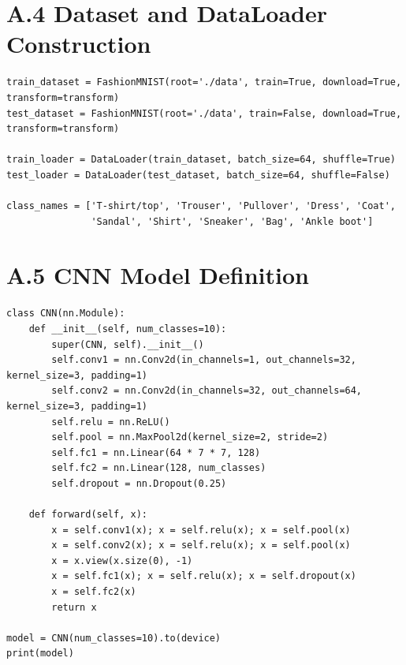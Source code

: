 \documentclass[12pt,a4paper]{report}
\begin{document}
\section*{A.4 Dataset and DataLoader Construction}
\begin{lstlisting}
train_dataset = FashionMNIST(root='./data', train=True, download=True, transform=transform)
test_dataset = FashionMNIST(root='./data', train=False, download=True, transform=transform)

train_loader = DataLoader(train_dataset, batch_size=64, shuffle=True)
test_loader = DataLoader(test_dataset, batch_size=64, shuffle=False)

class_names = ['T-shirt/top', 'Trouser', 'Pullover', 'Dress', 'Coat',
               'Sandal', 'Shirt', 'Sneaker', 'Bag', 'Ankle boot']
\end{lstlisting}

\section*{A.5 CNN Model Definition}
\begin{lstlisting}
class CNN(nn.Module):
    def __init__(self, num_classes=10):
        super(CNN, self).__init__()
        self.conv1 = nn.Conv2d(in_channels=1, out_channels=32, kernel_size=3, padding=1)
        self.conv2 = nn.Conv2d(in_channels=32, out_channels=64, kernel_size=3, padding=1)
        self.relu = nn.ReLU()
        self.pool = nn.MaxPool2d(kernel_size=2, stride=2)
        self.fc1 = nn.Linear(64 * 7 * 7, 128)
        self.fc2 = nn.Linear(128, num_classes)
        self.dropout = nn.Dropout(0.25)

    def forward(self, x):
        x = self.conv1(x); x = self.relu(x); x = self.pool(x)
        x = self.conv2(x); x = self.relu(x); x = self.pool(x)
        x = x.view(x.size(0), -1)
        x = self.fc1(x); x = self.relu(x); x = self.dropout(x)
        x = self.fc2(x)
        return x

model = CNN(num_classes=10).to(device)
print(model)
\end{lstlisting}
\end{document}
